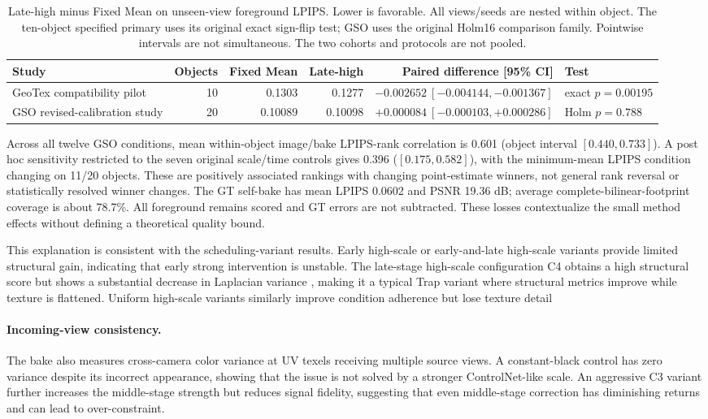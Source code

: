 \documentclass[times,twocolumn,final]{elsarticle}
\providecommand{\DIFadd}[1]{{\protect\color{blue} \sf #1}} %
\providecommand{\DIFdel}[1]{{\protect\color{red} \scriptsize #1}} %
\providecommand{\DIFaddbegin}{} %
\providecommand{\DIFaddend}{} %
\providecommand{\DIFdelbegin}{} %
\providecommand{\DIFdelend}{} %
\begin{document}
\begin{table}[t]\centering\scriptsize\setlength{\tabcolsep}{4pt}
\caption{Late-high minus Fixed Mean on unseen-view foreground LPIPS. Lower is favorable. All views/seeds are nested within object. The ten-object specified primary uses its original exact sign-flip test; GSO uses the original Holm16 comparison family. Pointwise intervals are not simultaneous. The two cohorts and protocols are not pooled.}
\label{tab:bake-cohorts}
\begin{tabular}{lrrrrl}
\toprule Study & Objects & Fixed Mean & Late-high & Paired difference [95\% CI] & Test \\
\midrule
GeoTex compatibility pilot & 10 & 0.1303 & 0.1277 & $-0.002652\ [-0.004144,-0.001367]$ & exact $p=0.00195$ \\
GSO revised-calibration study & 20 & 0.10089 & 0.10098 & $+0.000084\ [-0.000103,+0.000286]$ & Holm $p=0.788$ \\
\bottomrule\end{tabular}\end{table}

\DIFadd{Across all twelve GSO conditions, mean within-object image/bake LPIPS-rank correlation is 0.601 (object interval $[0.440,0.733]$). A post hoc sensitivity restricted to the seven original scale/time controls gives 0.396 ($[0.175,0.582]$), with the minimum-mean LPIPS condition changing on 11/20 objects. These are positively associated rankings with changing point-estimate winners, not general rank reversal or statistically resolved winner changes. The GT self-bake has mean LPIPS 0.0602 and PSNR 19.36 dB; average complete-bilinear-footprint coverage is about 78.7\%. All foreground remains scored and GT errors are not subtracted. These losses contextualize the small method effects without defining a theoretical quality bound}\DIFaddend .

\DIFdelbegin \DIFdel{This explanation is consistent with the scheduling-variant results. Early high-scale or early-and-late high-scale variants provide limited structural gain, indicating that early strong intervention is unstable. The late-stage high-scale configuration C4 obtains a high structural score but shows a substantial decrease in Laplacian variance , making it a typical Trap variant where structural metrics improve while texture is flattened. Uniform high-scale variants similarly improve condition adherence but lose texture detail}\DIFdelend \DIFaddbegin \paragraph{Incoming-view consistency.}
\DIFadd{The bake also measures cross-camera color variance at UV texels receiving multiple source views. A constant-black control has zero variance despite its incorrect appearance}\DIFaddend , showing that \DIFdelbegin \DIFdel{the issue is not solved by a stronger ControlNet-like scale. An aggressive C3 variant further increases the middle-stage strength but reduces signal fidelity, suggesting that even middle-stage correction has diminishing returns and can lead to over-constraint. }%
\end{document}
